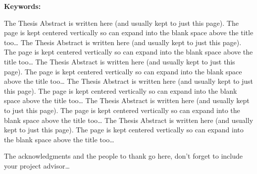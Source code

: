 \documentclass[
12pt, %
english, %
onehalfspacing, %
headsepline, %
]{MastersDoctoralThesis} %
\begin{document}
\begin{abstractfr}



\textbf{Keywords:} \keywordnames

	The Thesis Abstract is written here (and usually kept to just this page). The page is kept centered vertically so can expand into the blank space above the title too\ldots
	The Thesis Abstract is written here (and usually kept to just this page). The page is kept centered vertically so can expand into the blank space above the title too\ldots
	The Thesis Abstract is written here (and usually kept to just this page). The page is kept centered vertically so can expand into the blank space above the title too\ldots
	The Thesis Abstract is written here (and usually kept to just this page). The page is kept centered vertically so can expand into the blank space above the title too\ldots
	The Thesis Abstract is written here (and usually kept to just this page). The page is kept centered vertically so can expand into the blank space above the title too\ldots
	The Thesis Abstract is written here (and usually kept to just this page). The page is kept centered vertically so can expand into the blank space above the title too\ldots


	
	
\end{abstractfr}


\begin{acknowledgements}
\addchaptertocentry{\acknowledgementname} %
The acknowledgments and the people to thank go here, don't forget to include your project advisor\ldots
\end{acknowledgements}


\tableofcontents %

\listoffigures %

\listoftables %
\end{document}
